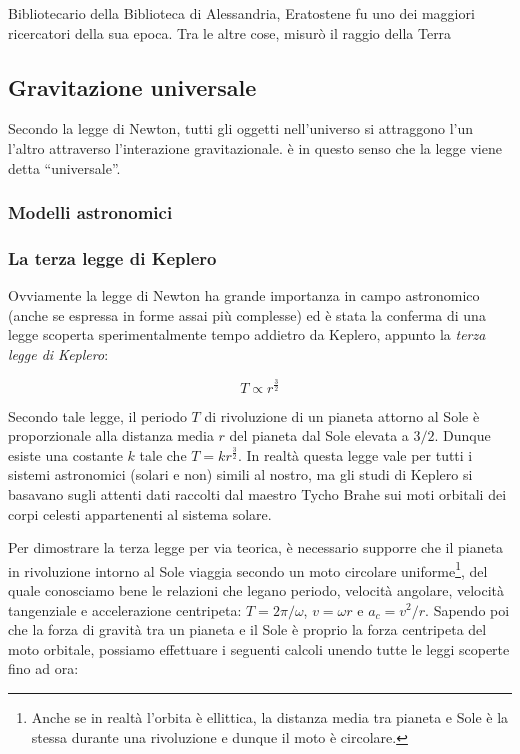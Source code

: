 Bibliotecario della Biblioteca di Alessandria, Eratostene fu uno dei
maggiori ricercatori della sua epoca. Tra le altre cose, misurò il
raggio della Terra


\subsection{Gravitazione universale}
Secondo la legge di Newton, tutti gli oggetti nell'universo si attraggono l'un l'altro
attraverso l'interazione gravitazionale. è in questo senso che la legge viene detta
``universale''.

\subsubsection{Modelli astronomici}

\subsubsection{La terza legge di Keplero}
Ovviamente la legge di Newton ha grande importanza in campo astronomico (anche
se espressa in forme assai più complesse) ed è stata la conferma di una legge scoperta
sperimentalmente tempo addietro da Keplero, appunto la \textit{terza legge di Keplero}:

\[ T \propto r^\frac{3}{2} \]

\noindent Secondo tale legge, il periodo $T$ di rivoluzione di un pianeta attorno al Sole
è proporzionale alla distanza media $r$ del pianeta dal Sole elevata a $3/2$. Dunque esiste
una costante $k$ tale che $T = kr^\frac{3}{2}$. In realtà
questa legge vale per tutti i sistemi astronomici (solari e non) simili al nostro, ma
gli studi di Keplero si basavano sugli attenti dati raccolti dal maestro Tycho Brahe
sui moti orbitali dei corpi celesti appartenenti al sistema solare.

Per dimostrare la terza legge per via teorica, è necessario supporre che il pianeta
in rivoluzione intorno al Sole viaggia secondo un moto circolare uniforme\footnote{Anche se in realtà
l'orbita è ellittica, la distanza media tra pianeta e Sole è la stessa durante una rivoluzione e dunque il
moto è circolare.}, del quale conosciamo bene le relazioni che legano periodo, velocità
angolare, velocità tangenziale e accelerazione centripeta: $T = 2\pi/\omega$, $v = \omega r$ e
$a_c = v^2/r$.
Sapendo poi che la forza di gravità tra un pianeta e il Sole è proprio la forza
centripeta del moto orbitale, possiamo effettuare i seguenti calcoli unendo tutte
le leggi scoperte fino ad ora:

